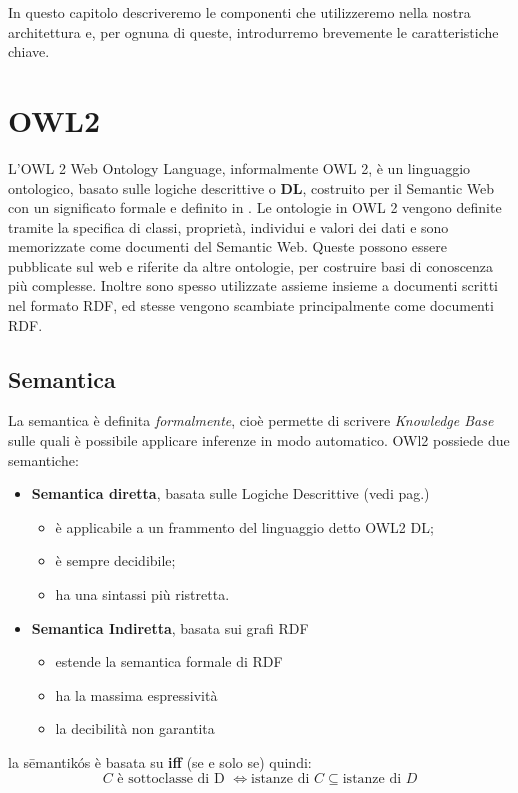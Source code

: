 In questo capitolo descriveremo le componenti che utilizzeremo nella nostra
architettura e, per ognuna di queste, introdurremo brevemente le caratteristiche chiave.

\section{OWL2}

L'OWL 2 Web Ontology Language, informalmente OWL 2, è un linguaggio ontologico, basato sulle
logiche descrittive o \textbf{DL}, costruito 
per il Semantic Web con un significato formale e definito in \cite{OWl2Primer}.
Le ontologie in OWL 2 vengono definite tramite la specifica di classi, proprietà, individui e valori dei dati e sono memorizzate come documenti del Semantic Web.
Queste possono essere pubblicate sul web e riferite da altre ontologie, per costruire basi di conoscenza più complesse. 
Inoltre sono spesso utilizzate assieme insieme a documenti scritti nel formato RDF, ed stesse vengono scambiate principalmente come documenti RDF.

\subsection{Semantica}
La semantica è definita \textit{formalmente}, cioè permette di scrivere \textit{Knowledge Base} sulle quali è possibile applicare inferenze in modo automatico.
OWl2 possiede due semantiche:
\begin{itemize}
	\item[] \textbf{Semantica diretta}, basata sulle Logiche Descrittive (vedi pag.\pageref{chap: DL})
		\begin{itemize}
			\item è applicabile a un frammento del linguaggio detto OWL2 DL;
			\item è sempre decidibile;
			\item ha una sintassi più ristretta. 
		\end{itemize}
	\item[] \textbf{Semantica Indiretta}, basata sui grafi RDF
		\begin{itemize}
			\item estende la semantica formale di RDF
			\item ha la massima espressività 
			\item la decibilità non garantita
		\end{itemize}
\end{itemize}
la sēmantikós è basata su \textbf{iff} (se e solo se) quindi:
\[ C \text{ è sottoclasse di D } \iff  \text{istanze di } C \subseteq \text{istanze di } D \]

